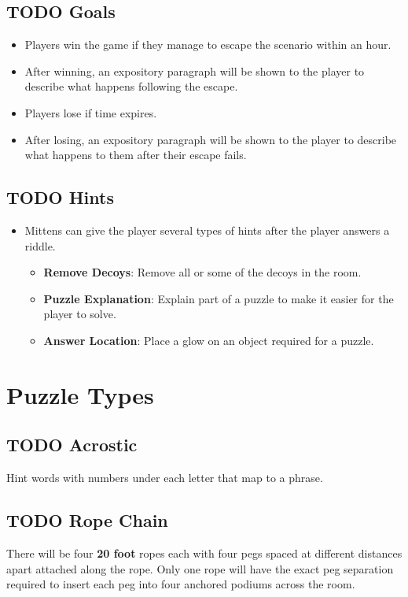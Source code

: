 \documentclass[11pt]{article}
\begin{document}
\subsection{{\bfseries\sffamily TODO} Goals}
\label{sec:org343f2be}
\begin{itemize}
\item Players win the game if they manage to escape the scenario within an hour.
\item After winning, an expository paragraph will be shown to the player to describe what happens following the escape.
\item Players lose if time expires.
\item After losing, an expository paragraph will be shown to the player to describe what happens to them after their escape fails.
\end{itemize}

\subsection{{\bfseries\sffamily TODO} Hints}
\label{sec:org929091c}
\begin{itemize}
\item Mittens can give the player several types of hints after the player answers a riddle.
\begin{itemize}
\item \textbf{Remove Decoys}: Remove all or some of the decoys in the room.
\item \textbf{Puzzle Explanation}: Explain part of a puzzle to make it easier for the player to solve.
\item \textbf{Answer Location}: Place a glow on an object required for a puzzle.
\end{itemize}
\end{itemize}

\section{Puzzle Types}
\label{sec:org9912620}
\subsection{{\bfseries\sffamily TODO} Acrostic}
\label{sec:org1f9c2c4}
Hint words with numbers under each letter that map to a phrase.

\subsection{{\bfseries\sffamily TODO} Rope Chain}
\label{sec:orgf894ec1}
There will be four \textbf{20 foot} ropes each with four pegs spaced at different distances apart attached along the rope. Only one rope will have the exact peg separation required to insert each peg into four anchored podiums across the room.
\end{document}
